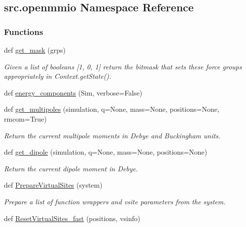 \hypertarget{namespacesrc_1_1openmmio}{}\subsection{src.\+openmmio Namespace Reference}
\label{namespacesrc_1_1openmmio}
\subsubsection*{Functions}
\begin{DoxyCompactItemize}
\item 
def \hyperlink{namespacesrc_1_1openmmio_ad7583e022fa36c353cef6481931550bb}{get\+\_\+mask} (grps)
\begin{DoxyCompactList}\small\item\em Given a list of booleans \mbox{[}1, 0, 1\mbox{]} return the bitmask that sets these force groups appropriately in Context.\+get\+State(). \end{DoxyCompactList}\item 
def \hyperlink{namespacesrc_1_1openmmio_a507e4cd5f30d91e2050f64294a63c988}{energy\+\_\+components} (Sim, verbose=False)
\item 
def \hyperlink{namespacesrc_1_1openmmio_ad38addc4a72dedef5717b71f4680c02f}{get\+\_\+multipoles} (simulation, q=None, mass=None, positions=None, rmcom=True)
\begin{DoxyCompactList}\small\item\em Return the current multipole moments in Debye and Buckingham units. \end{DoxyCompactList}\item 
def \hyperlink{namespacesrc_1_1openmmio_a8b766c129297cc81c86b244f7bc56dac}{get\+\_\+dipole} (simulation, q=None, mass=None, positions=None)
\begin{DoxyCompactList}\small\item\em Return the current dipole moment in Debye. \end{DoxyCompactList}\item 
def \hyperlink{namespacesrc_1_1openmmio_a14cbde182c75ab72b116ec6eb9bd92f2}{Prepare\+Virtual\+Sites} (system)
\begin{DoxyCompactList}\small\item\em Prepare a list of function wrappers and vsite parameters from the system. \end{DoxyCompactList}\item 
def \hyperlink{namespacesrc_1_1openmmio_a26d4930d37579b96258528deeee33550}{Reset\+Virtual\+Sites\+\_\+fast} (positions, vsinfo)

\end{DoxyCompactItemize}
